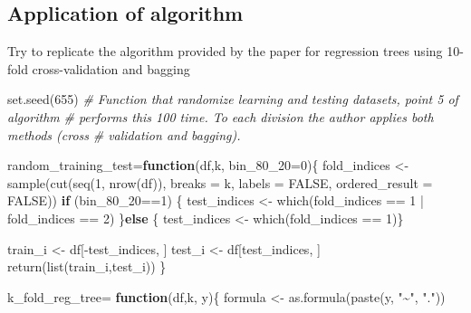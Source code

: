 \documentclass[
]{article}
\newenvironment{Shaded}{\begin{snugshade}}{\end{snugshade}}
\newcommand{\AttributeTok}[1]{\textcolor[rgb]{0.77,0.63,0.00}{#1}}
\newcommand{\CommentTok}[1]{\textcolor[rgb]{0.56,0.35,0.01}{\textit{#1}}}
\newcommand{\ConstantTok}[1]{\textcolor[rgb]{0.00,0.00,0.00}{#1}}
\newcommand{\ControlFlowTok}[1]{\textcolor[rgb]{0.13,0.29,0.53}{\textbf{#1}}}
\newcommand{\DecValTok}[1]{\textcolor[rgb]{0.00,0.00,0.81}{#1}}
\newcommand{\FunctionTok}[1]{\textcolor[rgb]{0.00,0.00,0.00}{#1}}
\newcommand{\NormalTok}[1]{#1}
\newcommand{\OtherTok}[1]{\textcolor[rgb]{0.56,0.35,0.01}{#1}}
\newcommand{\SpecialCharTok}[1]{\textcolor[rgb]{0.00,0.00,0.00}{#1}}
\newcommand{\StringTok}[1]{\textcolor[rgb]{0.31,0.60,0.02}{#1}}
\begin{document}
\hypertarget{application-of-algorithm}{%
\subsection{Application of algorithm}\label{application-of-algorithm}}

Try to replicate the algorithm provided by the paper for regression
trees using 10-fold cross-validation and bagging

\begin{Shaded}
\begin{Highlighting}[]
\FunctionTok{set.seed}\NormalTok{(}\DecValTok{655}\NormalTok{)}
\CommentTok{\# Function that randomize learning and testing datasets, point 5 of algorithm}
\CommentTok{\# performs this 100 time. To each division the author applies both methods (cross }
\CommentTok{\# validation and bagging). }

\NormalTok{random\_training\_test}\OtherTok{=}\ControlFlowTok{function}\NormalTok{(df,k, }\AttributeTok{bin\_80\_20=}\DecValTok{0}\NormalTok{)\{}
\NormalTok{  fold\_indices }\OtherTok{\textless{}{-}} \FunctionTok{sample}\NormalTok{(}\FunctionTok{cut}\NormalTok{(}\FunctionTok{seq}\NormalTok{(}\DecValTok{1}\NormalTok{, }\FunctionTok{nrow}\NormalTok{(df)), }\AttributeTok{breaks =}\NormalTok{ k, }\AttributeTok{labels =} \ConstantTok{FALSE}\NormalTok{, }
                             \AttributeTok{ordered\_result =} \ConstantTok{FALSE}\NormalTok{))}
  \ControlFlowTok{if}\NormalTok{ (bin\_80\_20}\SpecialCharTok{==}\DecValTok{1}\NormalTok{) \{}
\NormalTok{    test\_indices }\OtherTok{\textless{}{-}} \FunctionTok{which}\NormalTok{(fold\_indices }\SpecialCharTok{==} \DecValTok{1} \SpecialCharTok{|}\NormalTok{ fold\_indices }\SpecialCharTok{==} \DecValTok{2}\NormalTok{)}
\NormalTok{  \}}\ControlFlowTok{else}\NormalTok{ \{}
\NormalTok{    test\_indices }\OtherTok{\textless{}{-}} \FunctionTok{which}\NormalTok{(fold\_indices }\SpecialCharTok{==} \DecValTok{1}\NormalTok{)\}}
  
\NormalTok{  train\_i }\OtherTok{\textless{}{-}}\NormalTok{ df[}\SpecialCharTok{{-}}\NormalTok{test\_indices, ]}
\NormalTok{  test\_i }\OtherTok{\textless{}{-}}\NormalTok{ df[test\_indices, ]}
  \FunctionTok{return}\NormalTok{(}\FunctionTok{list}\NormalTok{(train\_i,test\_i))}
\NormalTok{\}}



\NormalTok{k\_fold\_reg\_tree}\OtherTok{=} \ControlFlowTok{function}\NormalTok{(df,k, y)\{}
\NormalTok{  formula }\OtherTok{\textless{}{-}} \FunctionTok{as.formula}\NormalTok{(}\FunctionTok{paste}\NormalTok{(y, }\StringTok{"\textasciitilde{}"}\NormalTok{, }\StringTok{"."}\NormalTok{))}
  

\end{Highlighting}
\end{Shaded}
\end{document}
